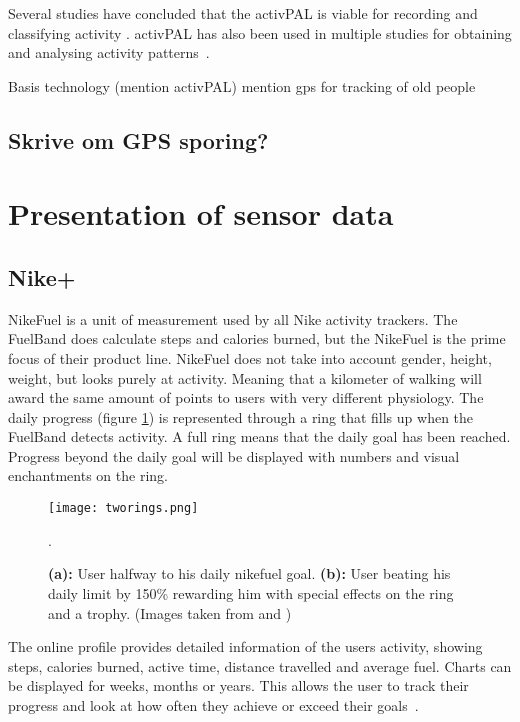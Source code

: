 Several studies have concluded that the activPAL is viable for recording and classifying activity \cite{grant2006, ryan2006, grant2008, tsavourelou}. activPAL has also been used in multiple studies for obtaining and analysing activity patterns~\cite{grant2010, lord, ryan2010}.

Basis technology (mention activPAL) mention gps for tracking of old people
\subsection{Skrive om GPS sporing?}

\section{Presentation of sensor data}
\subsection{Nike+}
NikeFuel \cite{nikefuel} is a unit of measurement used by all Nike activity trackers. The FuelBand does calculate steps and calories burned, but the NikeFuel is the prime focus of their product line. NikeFuel does not take into account gender, height, weight, but looks purely at activity. Meaning that a kilometer of walking will award the same amount of points to users with very different physiology. The daily progress (figure \ref{fig:tworings}) is represented through a ring that fills up when the FuelBand detects activity. A full ring means that the daily goal has been reached. Progress beyond the daily goal will be displayed with numbers and visual enchantments on the ring. 

\begin{figure}[h!]
	\centering
		\texttt{[image: tworings.png]}
		\caption{\footnotesize \textbf{(a):} User halfway to his daily nikefuel goal. \textbf{(b):} User beating his daily limit by 150\% rewarding him with special effects on the ring and a trophy. (Images taken from \cite{fuelbandDcRain} and \cite{fuelbandTechSpce})}.
		\label{fig:tworings}
\end{figure}

The online profile provides detailed information of the users activity, showing steps, calories burned, active time, distance travelled and average fuel. Charts can be displayed for weeks, months or years. This allows the user to track their progress and look at how often they achieve or exceed their goals~\cite{fuelbandTechSpce}. 

